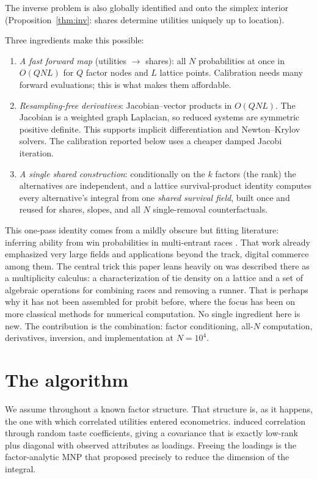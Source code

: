 \documentclass[12pt]{article}
\theoremstyle{remark}
\begin{document}
The inverse
problem is also globally identified and onto the simplex interior
(Proposition~\ref{thm:inv}: shares determine utilities uniquely up to
location). 

Three ingredients make this possible: 

\begin{enumerate}
\item \emph{A fast forward map} (utilities $\to$ shares): all $N$
probabilities at once in $O(QNL)$ for $Q$ factor nodes and $L$ lattice
points. Calibration needs many forward evaluations; this is what makes
them affordable.
\item \emph{Resampling-free derivatives}: Jacobian--vector products in
$O(QNL)$. The Jacobian is a weighted graph
Laplacian, so reduced systems are symmetric positive definite. This supports
implicit differentiation and Newton--Krylov solvers. The calibration
reported below uses a cheaper damped Jacobi iteration.
\item \emph{A single shared construction}: conditionally on the $k$
factors (the rank) the alternatives are independent, and a lattice survival-product
identity computes every alternative's integral from one \emph{shared
survival field}, built once and reused for shares, slopes, and all $N$
single-removal counterfactuals.
\end{enumerate}

This one-pass identity comes from a mildly obscure but fitting literature: inferring ability
from win probabilities in multi-entrant races \citep{cotton2021}. That
work already emphasized very large fields and applications beyond the
track, digital commerce among them. The central trick this paper
leans heavily on was described there as a multiplicity calculus: a characterization of tie density 
on a lattice and a set of algebraic operations for combining races and removing a runner. That is
perhaps why it has not been assembled for probit before, where the focus has been on more classical methods
for numerical computation. No single ingredient here is new. The contribution is the
combination: factor conditioning, all-$N$ computation, derivatives,
inversion, and implementation at $N = 10^4$.

\section{The algorithm}\label{sec:algorithm}

We assume throughout a known factor structure. That structure is, as
it happens, the one with which correlated utilities entered
econometrics. \citet{hausman1978} induced correlation
through random taste coefficients, giving a covariance that is exactly
low-rank plus diagonal with observed attributes as loadings. Freeing the
loadings is the factor-analytic MNP that \citet{mcfadden1984} proposed
precisely to reduce the dimension of the integral. 
\end{document}
